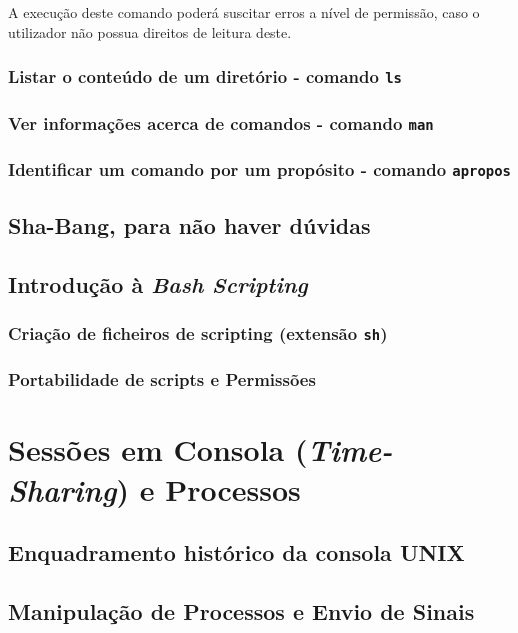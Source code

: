 \documentclass[a4paper, onecolumn, 10pt]{report}
\begin{document}
A execução deste comando poderá suscitar erros a nível de permissão, caso o utilizador não possua direitos de leitura deste.

\subsection{Listar o conteúdo de um diretório - comando \texttt{ls}}

\subsection{Ver informações acerca de comandos - comando \texttt{man}}

\subsection{Identificar um comando por um propósito - comando \texttt{apropos}}

\section{Sha-Bang, para não haver dúvidas}

\section{Introdução à \textit{Bash Scripting}}

\subsection{Criação de ficheiros de scripting (extensão \texttt{sh})}

\subsection{Portabilidade de scripts e Permissões}

\chapter{Sessões em Consola (\textit{Time-Sharing}) e Processos}

\section{Enquadramento histórico da consola UNIX}

\section{Manipulação de Processos e Envio de Sinais}
\end{document}
